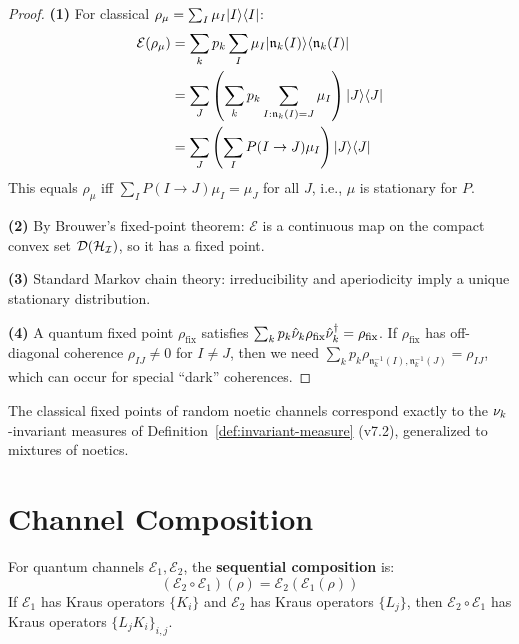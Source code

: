 \begin{proof}
\textbf{(1)} For classical $\rho_\mu = \sum_I \mu_I |I\rangle\langle I|$:
\begin{align}
\mathcal{E}(\rho_\mu) &= \sum_k p_k \sum_I \mu_I |\mathfrak{n}_k(I)\rangle\langle \mathfrak{n}_k(I)| \\
&= \sum_J \left( \sum_k p_k \sum_{I : \mathfrak{n}_k(I) = J} \mu_I \right) |J\rangle\langle J| \\
&= \sum_J \left( \sum_I P(I \to J) \mu_I \right) |J\rangle\langle J|
\end{align}
This equals $\rho_\mu$ iff $\sum_I P(I \to J) \mu_I = \mu_J$ for all $J$, i.e., $\mu$ is stationary for $P$.

\textbf{(2)} By Brouwer's fixed-point theorem: $\mathcal{E}$ is a continuous map on the compact convex set $\mathcal{D}(\mathcal{H}_{\mathcal{I}})$, so it has a fixed point.

\textbf{(3)} Standard Markov chain theory: irreducibility and aperiodicity imply a unique stationary distribution.

\textbf{(4)} A quantum fixed point $\rho_{\mathrm{fix}}$ satisfies $\sum_k p_k \hat{\nu}_k \rho_{\mathrm{fix}} \hat{\nu}_k^\dagger = \rho_{\mathrm{fix}}$. If $\rho_{\mathrm{fix}}$ has off-diagonal coherence $\rho_{IJ} \neq 0$ for $I \neq J$, then we need $\sum_k p_k \rho_{\mathfrak{n}_k^{-1}(I), \mathfrak{n}_k^{-1}(J)} = \rho_{IJ}$, which can occur for special ``dark'' coherences.
\end{proof}

\begin{corollary}
\label{cor:invariant-measure-channel}
The classical fixed points of random noetic channels correspond exactly to the $\nu_{k}$-invariant measures of Definition~\ref{def:invariant-measure} (v7.2), generalized to mixtures of noetics.
\end{corollary}

\section{Channel Composition}
\label{sec:channel-composition}

\begin{definition}
\label{def:sequential-composition}
For quantum channels $\mathcal{E}_1, \mathcal{E}_2$, the \textbf{sequential composition} is:
\[
(\mathcal{E}_2 \circ \mathcal{E}_1)(\rho) = \mathcal{E}_2(\mathcal{E}_1(\rho))
\]
If $\mathcal{E}_1$ has Kraus operators $\{K_i\}$ and $\mathcal{E}_2$ has Kraus operators $\{L_j\}$, then $\mathcal{E}_2 \circ \mathcal{E}_1$ has Kraus operators $\{L_j K_i\}_{i,j}$.
\end{definition}


